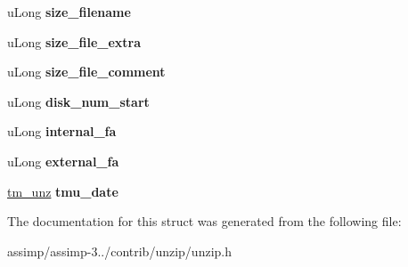 \begin{DoxyCompactItemize}
\item 
\hypertarget{structunz__file__info__s_ae4f2f81a5301f7df9014838a56a496c6}{u\+Long {\bfseries size\+\_\+filename}}\label{structunz__file__info__s_ae4f2f81a5301f7df9014838a56a496c6}

\item 
\hypertarget{structunz__file__info__s_a479402dcb3555c922e3ce87c8f967990}{u\+Long {\bfseries size\+\_\+file\+\_\+extra}}\label{structunz__file__info__s_a479402dcb3555c922e3ce87c8f967990}

\item 
\hypertarget{structunz__file__info__s_afa9feffb3b9c9c03e02599118d5f548e}{u\+Long {\bfseries size\+\_\+file\+\_\+comment}}\label{structunz__file__info__s_afa9feffb3b9c9c03e02599118d5f548e}

\item 
\hypertarget{structunz__file__info__s_ab7bfba2b7d0cdb7260a7cd9f9ccd00ff}{u\+Long {\bfseries disk\+\_\+num\+\_\+start}}\label{structunz__file__info__s_ab7bfba2b7d0cdb7260a7cd9f9ccd00ff}

\item 
\hypertarget{structunz__file__info__s_aa20738bf82bca71cc950b9475b5d8c3c}{u\+Long {\bfseries internal\+\_\+fa}}\label{structunz__file__info__s_aa20738bf82bca71cc950b9475b5d8c3c}

\item 
\hypertarget{structunz__file__info__s_ae3365fdb260668fca60bfb975b1513aa}{u\+Long {\bfseries external\+\_\+fa}}\label{structunz__file__info__s_ae3365fdb260668fca60bfb975b1513aa}

\item 
\hypertarget{structunz__file__info__s_ad52c08c65349f674b00244d81cdb1736}{\hyperlink{structtm__unz__s}{tm\+\_\+unz} {\bfseries tmu\+\_\+date}}\label{structunz__file__info__s_ad52c08c65349f674b00244d81cdb1736}

\end{DoxyCompactItemize}


The documentation for this struct was generated from the following file\+:\begin{DoxyCompactItemize}
\item 
assimp/assimp-\/3../contrib/unzip/unzip.\+h\end{DoxyCompactItemize}
